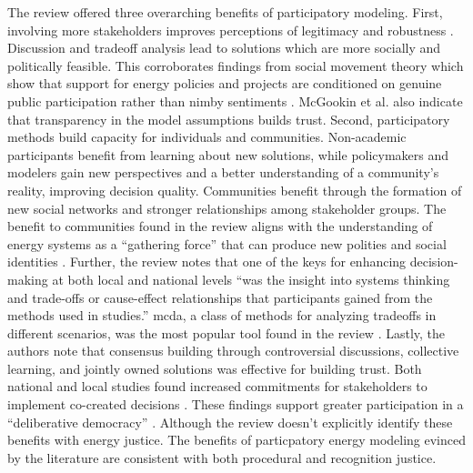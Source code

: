 The review offered three overarching benefits of participatory modeling. First,
involving more stakeholders improves perceptions of legitimacy and robustness
\cite{mcgookin_participatory_2021}. Discussion and tradeoff analysis lead to
solutions which are more socially and politically feasible. This corroborates
findings from social movement theory which show that support for energy policies
and projects are conditioned on genuine public participation rather than
\ac{nimby} sentiments \cite{summers_influencing_2020,ottinger_procedural_2014,
walker_procedural_2017,barragan-contreras_procedural_2022,gonyo_resident_2021,konisky_proximity_2021}.
McGookin et al. also indicate that transparency in the model assumptions builds
trust.
Second, participatory methods build capacity for individuals and communities.
Non-academic participants benefit from learning about new solutions, while
policymakers and modelers gain new perspectives and a better understanding of a
community's reality, improving decision quality. Communities benefit through the
formation of new social networks and stronger relationships among stakeholder
groups. The benefit to communities found in the review aligns with the
understanding of energy systems as a ``gathering force'' that can produce new
polities and social identities \cite{bridge_energy_2018}. Further, the review
notes that one of the keys for enhancing decision-making at both local and
national levels ``was the insight into systems thinking and trade-offs or
cause-effect relationships that participants gained from the methods used in
studies.'' \ac{mcda}, a class of methods for analyzing tradeoffs in different
scenarios, was the most popular tool found in the review
\cite{mcgookin_participatory_2021}. Lastly, the authors note that consensus
building through controversial discussions, collective learning, and jointly
owned solutions was effective for building trust. Both national and local
studies found increased commitments for stakeholders to implement co-created
decisions \cite{mcgookin_participatory_2021}. These findings support greater
participation in a ``deliberative democracy'' \cite{dryzek_deliberative_2013}.
Although the review doesn't explicitly identify these benefits with energy
justice. The benefits of particpatory energy modeling evinced by the literature
are consistent with both procedural and recognition justice.




